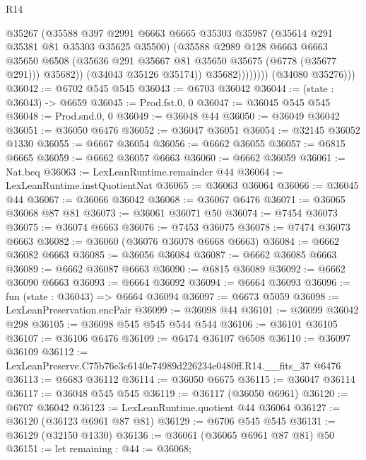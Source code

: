 \begin{lexlean}{R14}
\begin{coremodule}
                          @35267
                          (@35588
                            @397
                            @2991
                            @6663
                            @6665
                            @35303
                            @35987
                            (@35614 @291 @35381 @81 @35303 @35625 @35500)
                            (@35588
                              @2989
                              @128
                              @6663
                              @6663
                              @35650
                              @6508
                              (@35636 @291 @35667 @81 @35650 @35675 (@6778 (@35677 @291)))
                              @35682))
                          (@34043 @35126 @35174))
                        @35682))))))))
        (@34080 @35276)))
@36042 := @6702 @545 @545
@36043 := @6703 @36042
@36044 := (state : @36043) -> @6659
@36045 := Prod.fst.{0, 0}
@36047 := @36045 @545 @545
@36048 := Prod.snd.{0, 0}
@36049 := @36048 @44
@36050 := @36049 @36042
@36051 := @36050 @6476
@36052 := @36047 @36051
@36054 := @32145 @36052 @1330
@36055 := @6667 @36054
@36056 := @6662 @36055
@36057 := @6815 @6665
@36059 := @6662 @36057 @6663
@36060 := @6662 @36059
@36061 := Nat.beq
@36063 := LexLeanRuntime.remainder @44
@36064 := LexLeanRuntime.instQuotientNat
@36065 := @36063 @36064
@36066 := @36045 @44
@36067 := @36066 @36042
@36068 := @36067 @6476
@36071 := @36065 @36068 @87 @81
@36073 := @36061 @36071 @50
@36074 := @7454 @36073
@36075 := @36074 @6663
@36076 := @7453 @36075
@36078 := @7474 @36073 @6663
@36082 := @36060 (@36076 @36078 @6668 @6663)
@36084 := @6662 @36082 @6663
@36085 := @36056 @36084
@36087 := @6662 @36085 @6663
@36089 := @6662 @36087 @6663
@36090 := @6815 @36089
@36092 := @6662 @36090 @6663
@36093 := @6664 @36092
@36094 := @6664 @36093
@36096 := fun (state : @36043) => @6664 @36094
@36097 := @6673 @5059
@36098 := LexLeanPreservation.encPair
@36099 := @36098 @44
@36101 := @36099 @36042 @298
@36105 := @36098 @545 @545 @544 @544
@36106 := @36101 @36105
@36107 := @36106 @6476
@36109 := @6474 @36107 @6508
@36110 := @36097 @36109
@36112 := LexLeanPreserve.C75b76e3c6140e74989d226234e0480ff.R14.__fits_37 @6476
@36113 := @6683 @36112
@36114 := @36050 @6675
@36115 := @36047 @36114
@36117 := @36048 @545 @545
@36119 := @36117 (@36050 @6961)
@36120 := @6707 @36042
@36123 := LexLeanRuntime.quotient @44 @36064
@36127 := @36120 (@36123 @6961 @87 @81)
@36129 := @6706 @545 @545
@36131 := @36129 (@32150 @1330)
@36136 := @36061 (@36065 @6961 @87 @81) @50
@36151 := let remaining : @44 := @36068;

\end{coremodule}
\end{lexlean}
